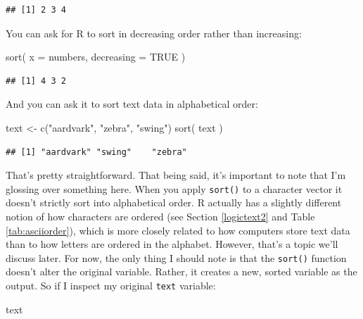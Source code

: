 \documentclass[
]{book}
\newenvironment{Shaded}{\begin{snugshade}}{\end{snugshade}}
\newcommand{\AttributeTok}[1]{\textcolor[rgb]{0.77,0.63,0.00}{#1}}
\newcommand{\ConstantTok}[1]{\textcolor[rgb]{0.00,0.00,0.00}{#1}}
\newcommand{\FunctionTok}[1]{\textcolor[rgb]{0.00,0.00,0.00}{#1}}
\newcommand{\NormalTok}[1]{#1}
\newcommand{\OtherTok}[1]{\textcolor[rgb]{0.56,0.35,0.01}{#1}}
\newcommand{\StringTok}[1]{\textcolor[rgb]{0.31,0.60,0.02}{#1}}
\begin{document}
\begin{verbatim}
## [1] 2 3 4
\end{verbatim}

You can ask for R to sort in decreasing order rather than increasing:

\begin{Shaded}
\begin{Highlighting}[]
\FunctionTok{sort}\NormalTok{( }\AttributeTok{x =}\NormalTok{ numbers, }\AttributeTok{decreasing =} \ConstantTok{TRUE}\NormalTok{ )}
\end{Highlighting}
\end{Shaded}

\begin{verbatim}
## [1] 4 3 2
\end{verbatim}

And you can ask it to sort text data in alphabetical order:

\begin{Shaded}
\begin{Highlighting}[]
\NormalTok{text }\OtherTok{\textless{}{-}} \FunctionTok{c}\NormalTok{(}\StringTok{"aardvark"}\NormalTok{, }\StringTok{"zebra"}\NormalTok{, }\StringTok{"swing"}\NormalTok{)}
\FunctionTok{sort}\NormalTok{( text )}
\end{Highlighting}
\end{Shaded}

\begin{verbatim}
## [1] "aardvark" "swing"    "zebra"
\end{verbatim}

That's pretty straightforward. That being said, it's important to note that I'm glossing over something here. When you apply \texttt{sort()} to a character vector it doesn't strictly sort into alphabetical order. R actually has a slightly different notion of how characters are ordered (see Section \ref{logictext2} and Table \ref{tab:asciiorder}), which is more closely related to how computers store text data than to how letters are ordered in the alphabet. However, that's a topic we'll discuss later. For now, the only thing I should note is that the \texttt{sort()} function doesn't alter the original variable. Rather, it creates a new, sorted variable as the output. So if I inspect my original \texttt{text} variable:

\begin{Shaded}
\begin{Highlighting}[]
\NormalTok{text}
\end{Highlighting}
\end{Shaded}
\end{document}

